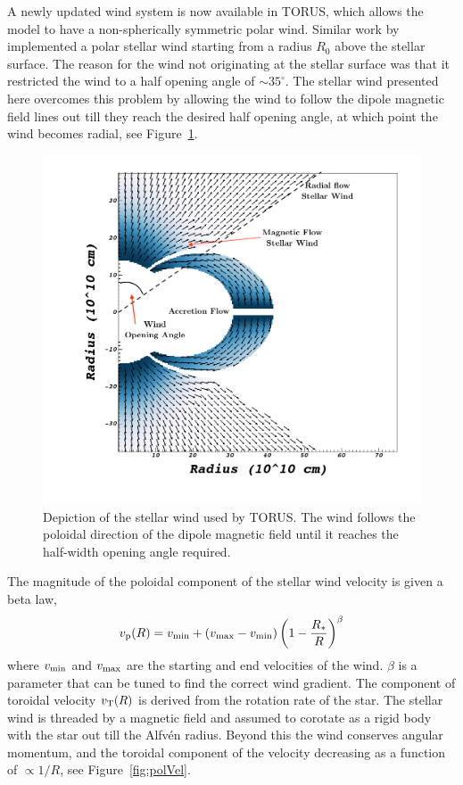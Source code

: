 \documentclass[fleqn,usenatbib]{mnras}
\begin{document}
A newly updated wind system is now available in TORUS, which allows the model to have a non-spherically symmetric polar wind. Similar work by \citet{Kurosawa:2011fh} implemented a polar stellar wind starting from a radius $R_0$ above the stellar surface. The reason for the wind not originating at the stellar surface was that it restricted the wind to a half opening angle of $\sim 35^{\circ}$. The stellar wind presented here overcomes this problem by allowing the wind to follow the dipole magnetic field lines out till they reach the desired half opening angle, at which point the wind becomes radial, see Figure~\ref{fig:wind}.
\begin{figure}
    \centering
    \includegraphics[width=\linewidth]{figures/wind}
    \caption{Depiction of the stellar wind used by TORUS. The wind follows the poloidal direction of the dipole magnetic field until it reaches the half-width opening angle required.}
    \label{fig:wind}
\end{figure}
The magnitude of the poloidal component of the stellar wind velocity is given a beta law,
\begin{equation}
    v_{\rm p}(R) = v_{\rm min} + \left( v_{\rm max}-v_{\rm min}\right)\left(1-\frac{R_{\ast}}{R}\right)^{\beta}
    \label{eq:beta}
\end{equation}
where $v_{\rm min}$ and $v_{\rm max}$ are the starting and end velocities of the wind. $\beta$ is a parameter that can be tuned to find the correct wind gradient. The component of toroidal velocity $v_{\rm T}(R)$ is derived from the rotation rate of the star. The stellar wind is threaded by a magnetic field and assumed to corotate as a rigid body with the star out till the Alfv\'en radius. Beyond this the wind conserves angular momentum, and the toroidal component of the velocity decreasing as a function of $\propto 1/R$, see Figure~\ref{fig:polVel}.
\end{document}

